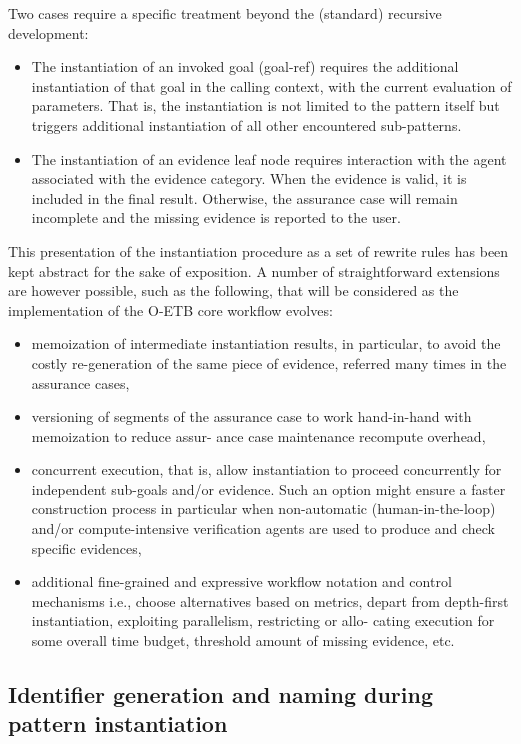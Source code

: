 \documentclass[12pt,twoside,a4paper]{article}
\begin{document}
Two cases require a specific treatment beyond the (standard) recursive development:

\begin{itemize}
\item
  The instantiation of an invoked goal (goal-ref) requires the additional instantiation of that goal in the calling context, with the current evaluation of parameters. That is, the instantiation is not limited to the pattern itself but triggers additional instantiation of all other encountered sub-patterns.
\item
  The instantiation of an evidence leaf node requires interaction with the agent associated with the evidence category. When the evidence is valid, it is included in the final result. Otherwise, the assurance case will remain incomplete and the missing evidence is reported to the user.
\end{itemize}

This presentation of the instantiation procedure as a set of rewrite rules has been kept abstract for the sake of exposition. A number of straightforward extensions are however possible, such as the following, that will be considered as the implementation of the O-ETB core workflow evolves:

\begin{itemize}
\item
  memoization of intermediate instantiation results, in particular, to avoid the costly re-generation of the same piece of evidence, referred many times in the assurance cases,
\item
  versioning of segments of the assurance case to work hand-in-hand with memoization to reduce assur- ance case maintenance recompute overhead,
\item
  concurrent execution, that is, allow instantiation to proceed concurrently for independent sub-goals and/or evidence. Such an option might ensure a faster construction process in particular when non-automatic (human-in-the-loop) and/or compute-intensive verification agents are used to produce and check specific evidences,
\item
  additional fine-grained and expressive workflow notation and control mechanisms i.e., choose alternatives based on metrics, depart from depth-first instantiation, exploiting parallelism, restricting or allo- cating execution for some overall time budget, threshold amount of missing evidence, etc.
\end{itemize}

\subsection{Identifier generation and naming during pattern instantiation}
\label{sec:aco-id-generation}
\end{document}
